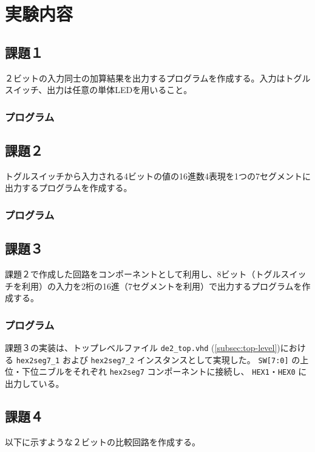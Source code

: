 \documentclass[12pt,a4paper]{ltjsarticle}
\begin{document}
\section{実験内容}

\subsection{課題１}
２ビットの入力同士の加算結果を出力するプログラムを作成する。入力はトグルスイッチ、出力は任意の単体LEDを用いること。

\subsubsection{プログラム}



\subsection{課題２}
トグルスイッチから入力される4ビットの値の16進数4表現を1つの7セグメントに出力するプログラムを作成する。

\subsubsection{プログラム}


\subsection{課題３}
課題２で作成した回路をコンポーネントとして利用し、8ビット（トグルスイッチを利用）の入力を2桁の16進（7セグメントを利用）で出力するプログラムを作成する。

\subsubsection{プログラム}
課題３の実装は、トップレベルファイル \texttt{de2\_top.vhd} (\ref{subsec:top-level})における
\texttt{hex2seg7\_1} および \texttt{hex2seg7\_2} インスタンスとして実現した。
\texttt{SW[7:0]} の上位・下位ニブルをそれぞれ \texttt{hex2seg7} コンポーネントに接続し、
\texttt{HEX1}・\texttt{HEX0} に出力している。

\subsection{課題４}
以下に示すような２ビットの比較回路を作成する。
\end{document}
